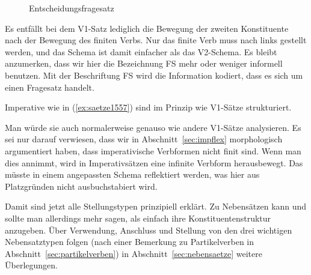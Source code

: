 \begin{exe}
\end{exe}

\begin{figure}[h]
  \centering
  \vspace{0.3cm}
  \caption{Entscheidungsfragesatz}
  \label{fig:v1satz}
\end{figure}

Es entfällt bei dem V1-Satz lediglich die Bewegung der zweiten Konstituente nach der Bewegung des finiten Verbs.
Nur das finite Verb muss nach links gestellt werden, und das Schema ist damit einfacher als das V2-Schema.
Es bleibt anzumerken, dass wir hier die Bezeichnung FS mehr oder weniger informell benutzen.
Mit der Beschriftung FS wird die Information kodiert, dass es sich um einen Fragesatz handelt.

\newpage
{}
Imperative wie in (\ref{ex:saetze1557}) sind im Prinzip wie V1-Sätze strukturiert.

\begin{exe}
\end{exe}

Man würde sie auch normalerweise genauso wie andere V1-Sätze analysieren.
Es sei nur darauf verwiesen, dass wir in Abschnitt~\ref{sec:impflex} morphologisch argumentiert haben, dass imperativische Verbformen nicht finit sind.
Wenn man dies annimmt, wird in Imperativsätzen eine infinite Verbform herausbewegt.
Das müsste in einem angepassten Schema reflektiert werden, was hier aus Platzgründen nicht ausbuchstabiert wird.


\begin{sloppypar}
Damit sind jetzt alle Stellungstypen prinzipiell erklärt.
Zu Nebensätzen kann und sollte man allerdings mehr sagen, als einfach ihre Konstituentenstruktur anzugeben.
Über Verwendung, Anschluss und Stellung von den drei wichtigen Nebensatztypen folgen (nach einer Bemerkung zu Partikelverben in Abschnitt~\ref{sec:partikelverben}) in Abschnitt~\ref{sec:nebensaetze} weitere Überlegungen.
\end{sloppypar}

